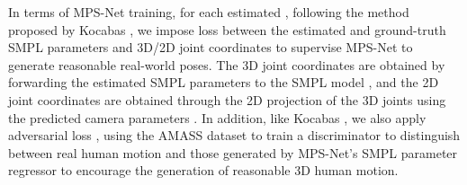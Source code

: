 \documentclass[10pt,twocolumn,letterpaper]{article}
\begin{document}
In terms of MPS-Net training, for each estimated , following the method proposed by Kocabas \etal \cite{Kocabas2020VIBEVI}, we impose  loss between the estimated and ground-truth SMPL parameters and 3D/2D joint coordinates to supervise MPS-Net to generate reasonable real-world poses. The 3D joint coordinates are obtained by forwarding the estimated SMPL parameters to the SMPL model \cite{Loper2015SMPLAS}, and the 2D joint coordinates are obtained through the 2D projection of the 3D joints using the predicted camera parameters \cite{Kocabas2020VIBEVI}. In addition, like Kocabas \etal \cite{Kocabas2020VIBEVI}, we also apply adversarial loss , \ie using the AMASS \cite{Mahmood2019AMASSAO} dataset to train a discriminator to distinguish between real human motion and those generated by MPS-Net's SMPL parameter regressor to encourage the generation of reasonable 3D human motion.\vspace{-6pt}
\end{document}
